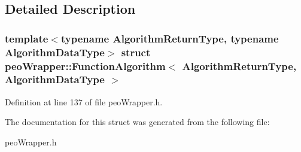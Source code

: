 \subsection{Detailed Description}
\subsubsection*{template$<$typename Algorithm\-Return\-Type, typename Algorithm\-Data\-Type$>$ struct peo\-Wrapper::Function\-Algorithm$<$ Algorithm\-Return\-Type, Algorithm\-Data\-Type $>$}





Definition at line 137 of file peo\-Wrapper.h.

The documentation for this struct was generated from the following file:\begin{CompactItemize}
\item 
peo\-Wrapper.h\end{CompactItemize}
